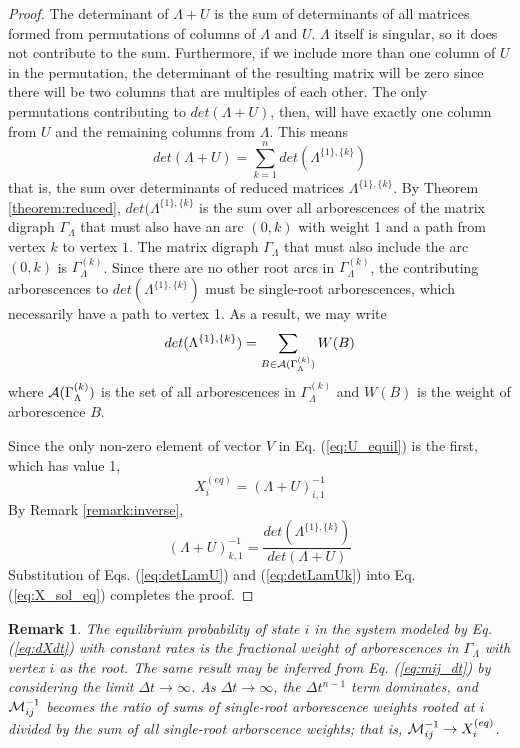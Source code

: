 \documentclass{article}
\newtheorem{remark}{Remark}
\begin{document}
\begin{proof}
The determinant of $\Lambda + U$ is 
the sum of determinants of all matrices formed from permutations of columns of $\Lambda$ and $U$.  $\Lambda$ itself is singular, so it does not contribute to the sum.  Furthermore, if we include more than one column of $U$ in the permutation, the determinant of the resulting matrix will be zero since there will be two columns that are multiples of each other.  The only permutations contributing to $det(\Lambda + U)$, then, will have exactly one column from $U$ and the remaining columns from $\Lambda$.  This means
\begin{equation}
    det(\Lambda + U) = \sum_{k=1}^n det(\Lambda^{\{1\},\{k\}})
    \label{eq:detLamU}
\end{equation}
that is, the sum over determinants of reduced matrices $\Lambda^{\{1\},\{k\}}$.  By Theorem \ref{theorem:reduced}, $det(\Lambda^{\{1\}, \{k\}}$ is the sum over all arborescences of the matrix digraph $\Gamma_\Lambda$ that must also have an arc $(0, k)$ with weight 1 and a path from vertex $k$ to vertex $1$.  The matrix digraph $\Gamma_\Lambda$ that must also include the arc $(0, k)$ is $\Gamma_\Lambda^{(k)}$.  Since there are no other root arcs in $\Gamma_\Lambda^{(k)}$, the contributing arborescences to $det(\Lambda^{\{1\},\{k\}})$ must be single-root arborescences, which necessarily have a path to vertex 1. As a result, we may write
\begin{equation}
    det(\Lambda^{\{1\},\{k\}}) = \sum_{B\in {\cal A}(\Gamma_\Lambda^{(k)})} W(B)
    \label{eq:detLamUk}
\end{equation}
where ${\cal A}(\Gamma_\Lambda^{(k)})$ is the set of all arborescences in $\Gamma_\Lambda^{(k)}$ and $W(B)$ is the weight of arborescence $B$.

Since the only non-zero element of vector $V$ in Eq. (\ref{eq:U_equil}) is the first, which has value 1, 
\begin{equation}
    X_i^{(eq)} = \left(\Lambda + U\right)_{i,1}^{-1}
\end{equation}By Remark \ref{remark:inverse},
\begin{equation}
    \left(\Lambda + U\right)_{k,1}^{-1} = \frac{det(\Lambda^{\{1\},\{k\}})}{det(\Lambda + U)}
    \label{eq:X_sol_eq}
\end{equation}
Substitution of Eqs. (\ref{eq:detLamU}) and (\ref{eq:detLamUk}) into Eq. (\ref{eq:X_sol_eq}) completes the proof.
\end{proof}
\begin{remark}
The equilibrium probability of state $i$ in the system modeled by Eq. (\ref{eq:dXdt}) with constant rates is the fractional weight of arborescences in $\Gamma_\Lambda$ with vertex $i$ as the root.  The same result may be inferred from Eq. (\ref{eq:mij_dt}) by considering the limit $\Delta t \to \infty$.    As $\Delta t \to \infty$, the $\Delta t^{n-1}$ term dominates, and ${\cal M}_{ij}^{-1}$ becomes the ratio of sums of single-root arborescence weights rooted at $i$ divided by the sum of all single-root arborscence weights; that is, ${\cal M}_{ij}^{-1} \to X_i^{(eq)}$.
\end{remark}
\end{document}
